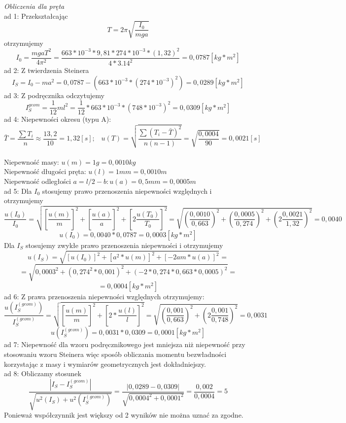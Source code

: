 \documentclass[a4paper,10pt,twoside]{article}
\begin{document}
\textit{Obliczenia dla pręta}
\noindent \\
ad 1: Przekształcając 
$$
T = 2\pi\sqrt{\frac{I_0}{mga}}
$$
otrzymujemy
$$
I_0 = \frac{mgaT^2}{4\pi^2} = \frac{663 * 10^{-3} * 9,81 * 274 * 10^{-3} * (1,32)^2}{4*3.14^2} = 0,0787[kg*m^2]
$$
ad 2: Z twierdzenia Steinera 
$$
I_S = I_0 - ma^2 = 0,0787 - (663*10^{-3}*(274*10^{-3})^2) = 0,0289[kg*m^2]
$$
ad 3: Z podręcznika odczytujemy $$I_S^{geom} = \frac{1}{12}ml^2 = \frac{1}{12}*663*10^{-3}*(748*10^{-3})^2 = 0,0309[kg*m^2]
$$
ad 4: Niepewności okresu (typu A): $$\bar{T} = \frac{\sum T_i}{n} \approx \frac{13,2}{10} = 1,32[s] ;\hspace{10pt} u(T) = \sqrt{\frac{\sum (T_i - \bar{T})^2}{n(n-1)}} = \sqrt{\frac{0,0004}{90}} = 0,0021[s] 
$$
\\ Niepewność masy: $u(m) = 1 g = 0,0010 kg$ 
\\ Niepewność długości pręta: $u(l) = 1 mm = 0,0010 m$
\\ Niepewność odległości $a = l/2 - b: u(a) = 0,5mm = 0,0005 m$
\\ad 5: Dla $I_0$ stosujemy prawo przenoszenia niepewności względnych i otrzymujemy 
$$
\frac{u(I_0)}{I_0} = \sqrt{\left[\frac{u(m)}{m}\right]^2 + \left[\frac{u(a)}{a}\right]^2 + \left[2\frac{u(T_0)}{T_0}\right]^2} = \sqrt{\left(\frac{0,0010}{0,663}\right)^2 + \left(\frac{0,0005}{0,274}\right)^2 + \left(2\frac{0,0021}{1,32}\right)^2} = 0,0040
$$
$$
u(I_0) = 0,0040 * 0,0787 = 0,0003[kg * m^2]
$$
Dla $I_S$ stosujemy zwykłe prawo przenoszenia niepewności i otrzymujemy 
$$
u(I_S) = \sqrt{[u(I_0)]^2 + [a^2 * u(m)]^2 + [-2 am * u(a)]^2} =$$ $$= \sqrt{0,0003^2 + (0,274^2 * 0,001)^2 + (-2*0,274*0,663*0,0005)^2} = $$
$$ = 0,0004[kg * m^2]
$$
ad 6: Z prawa przenoszenia niepewności względnych otrzymujemy:
$$
\frac{u(I_S^{(geom)})}{I_S^{(geom)}} = \sqrt{\left[\frac{u(m)}{m}\right]^2 + \left[2*\frac{u(l)}{l}\right]^2} = \sqrt{\left(\frac{0,001}{0,663}\right)^2 + \left(2\frac{0,001}{0,748}\right)^2} = 0,0031
$$
$$
u(I_S^{(geom)}) = 0,0031 * 0,0309 = 0,0001[kg*m^2]
$$
ad 7: Niepewność dla wzoru podręcznikowego jest mniejsza niż niepewność przy stosowaniu wzoru Steinera więc sposób obliczania momentu bezwładności korzystając z masy i wymiarów geometrycznych jest dokładniejszy.
\\ad 8: Obliczamy stosunek
$$
\frac{|I_S - I_S^{(geom)}|}{\sqrt{u^2(I_S) +  u^2(I_S^{(geom)})}} = \frac{|0,0289 - 0,0309|}{\sqrt{0,0004^2 + 0,0001^2}} = \frac{0,002}{0,0004} = 5
$$
Ponieważ współczynnik jest większy od 2 wyników nie można uznać za zgodne.
\vspace{20pt}
\end{document}
